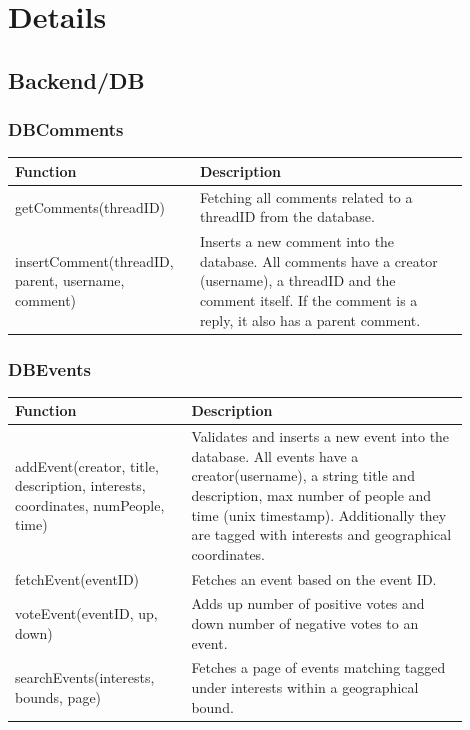 \section{Details}
\label{sec:CodeDetails}

\subsection{Backend/DB}
\label{subsec:CodeDetailsBackendDB}

\subsubsection{DBComments}
\begin{minipage}{\linewidth}
  \centering
  \setlength{\tabcolsep}{12pt}
  \begin{tabular}{|p{0.35\linewidth}|p{0.55\linewidth}|}
  \hline
  \cellcolor{gray!25} Function & \cellcolor{gray!25} Description \\
  \hline
  getComments(threadID) & Fetching all comments related to a threadID from the database. \\
  insertComment(threadID, parent, username, comment) & Inserts a new comment into the database. All comments have a creator (username), a threadID and the comment itself. If the comment is a reply, it also has a parent comment. \\
  \hline  
  \end{tabular}
\end{minipage}

\subsubsection{DBEvents}
\begin{minipage}{\linewidth}
  \centering
  \setlength{\tabcolsep}{12pt}
  \begin{tabular}{|p{0.35\linewidth}|p{0.55\linewidth}|}
  \hline
  \cellcolor{gray!25} Function & \cellcolor{gray!25} Description \\
  \hline
  addEvent(creator, title, description, interests, coordinates, numPeople, time) & Validates and inserts a new event into the database. All events have a creator(username), a string title and description, max number of people and time (unix timestamp). Additionally they are tagged with interests and geographical coordinates. \\
  fetchEvent(eventID) & Fetches an event based on the event ID. \\
  voteEvent(eventID, up, down) & Adds up number of positive votes and down number of negative votes to an event. \\
  searchEvents(interests, bounds, page) & Fetches a page of events matching tagged under interests within a geographical bound. \\
  \hline  
  \end{tabular}
\end{minipage}

